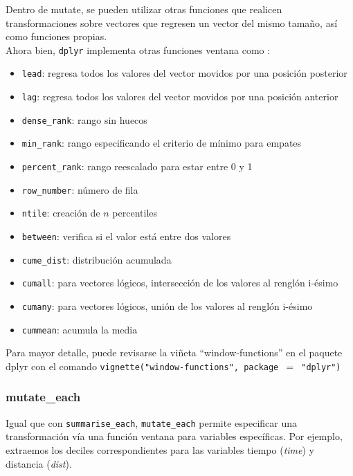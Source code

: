 \documentclass[]{article}
\begin{document}
\begin{curiosidad}
Dentro de mutate, se pueden utilizar otras funciones que realicen transformaciones
sobre vectores que regresen un vector del mismo tamaño, así como funciones
propias.\\

Ahora bien, \texttt{dplyr} implementa otras funciones ventana como \parencite{datawrangling}:\\

\begin{itemize}
\item \texttt{lead}: regresa todos los valores del vector movidos por una posición posterior
\item \texttt{lag}: regresa todos los valores del vector movidos por una posición anterior
\item \texttt{dense\_rank}: rango sin huecos
\item \texttt{min\_rank}: rango especificando el criterio de mínimo para empates
\item \texttt{percent\_rank}: rango reescalado para estar entre 0 y 1
\item \texttt{row\_number}: número de fila
\item \texttt{ntile}: creación de $n$ percentiles
\item \texttt{between}: verifica si el valor está entre dos valores
\item \texttt{cume\_dist}: distribución acumulada
\item \texttt{cumall}: para vectores lógicos, intersección de los valores al renglón i-ésimo
\item \texttt{cumany}: para vectores lógicos, unión de los valores al renglón i-ésimo
\item \texttt{cummean}: acumula la media \\
\end{itemize}

Para mayor detalle, puede revisarse la viñeta ``window-functions'' en el 
paquete dplyr \parencite{dplyr} con el comando \texttt{vignette("window-functions", package $=$ "dplyr")}
\end{curiosidad}

\subsubsection{mutate\_each}\label{mutate_each}

Igual que con \texttt{summarise\_each}, \texttt{mutate\_each} permite
especificar una transformación vía una función ventana para variables
específicas. Por ejemplo, extraemos los deciles correspondientes para
las variables tiempo (\emph{time}) y distancia (\emph{dist}).
\end{document}
